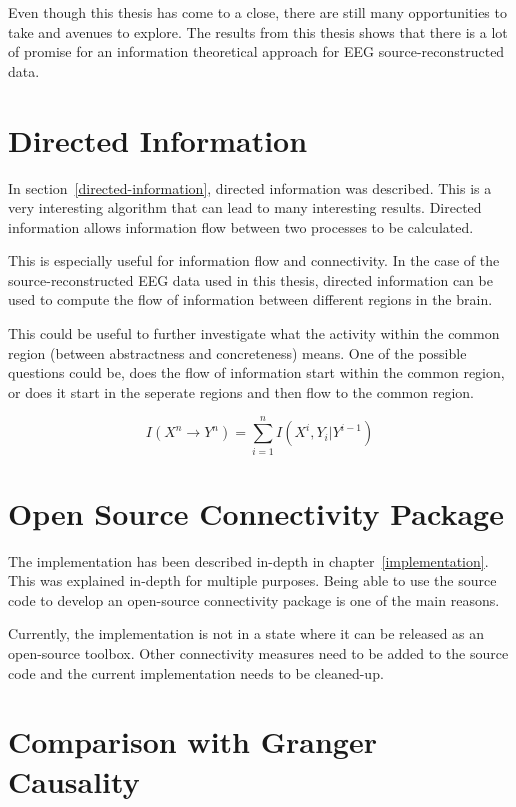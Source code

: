Even though this thesis has come to a close, there are still many opportunities to take and avenues to explore. The results from this thesis shows that there is a lot of promise for an information theoretical approach for EEG source-reconstructed data. 

\section{Directed Information}

In section~\ref{directed-information}, directed information was described. This is a very interesting algorithm that can lead to many interesting results. Directed information allows information flow between two processes to be calculated. 

This is especially useful for information flow and connectivity. In the case of the source-reconstructed EEG data used in this thesis, directed information can be used to compute the flow of information between different regions in the brain. 

This could be useful to further investigate what the activity within the common region (between abstractness and concreteness) means. One of the possible questions could be, does the flow of information start within the common region, or does it start in the seperate regions and then flow to the common region.

\begin{equation}
I(X^n \rightarrow Y^n) = \sum^{n}_{i=1}I(X^i, Y_i | Y^{i-1})
\end{equation}

\section{Open Source Connectivity Package}
The implementation has been described in-depth in chapter~\ref{implementation}. This was explained in-depth for multiple purposes. Being able to use the source code to develop an open-source connectivity package is one of the main reasons. 

Currently, the implementation is not in a state where it can be released as an open-source toolbox. Other connectivity measures need to be added to the source code and the current implementation needs to be cleaned-up. 

\section{Comparison with Granger Causality}

